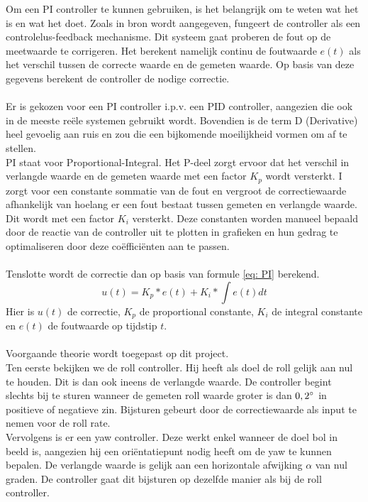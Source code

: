 \noindent
Om een PI controller te kunnen gebruiken, is het belangrijk om te weten wat het is en wat het doet. Zoals in bron \cite{website:PIDController} wordt aangegeven, fungeert de controller als een controlelus-feedback mechanisme. Dit systeem gaat proberen de fout op de meetwaarde te corrigeren. Het berekent namelijk continu de foutwaarde \(e(t)\) als het verschil tussen de correcte waarde en de gemeten waarde. Op basis van deze gegevens berekent de controller de nodige correctie.
\\
\\
Er is gekozen voor een PI controller i.p.v. een PID controller, aangezien die ook in de meeste re\"ele systemen gebruikt wordt. Bovendien is de term D (Derivative) heel gevoelig aan ruis en zou die een bijkomende moeilijkheid vormen om af te stellen.
\\
PI staat voor Proportional-Integral. Het P-deel zorgt ervoor dat het verschil in verlangde waarde en de gemeten waarde met een factor $K_p$ wordt versterkt. 
I zorgt voor een constante sommatie van de fout en vergroot de correctiewaarde afhankelijk van hoelang er een fout bestaat tussen gemeten en verlangde waarde. Dit wordt met een factor $K_i$ versterkt. Deze constanten worden manueel bepaald door de reactie van de controller uit te plotten in grafieken en hun gedrag te optimaliseren door deze co\"effici\"enten aan te passen.
\\
\\
Tenslotte wordt de correctie dan op basis van formule \ref{eq: PI} berekend.
\begin{equation} \label{eq: PI}
	u(t) = K_p * e(t) + K_i * \int e(t) dt
\end{equation}
Hier is \(u(t)\) de correctie, $K_p$ de proportional constante, $K_i$ de integral constante en \(e(t)\) de foutwaarde op tijdstip \(t\).
\\
\\
Voorgaande theorie wordt toegepast op dit project.
\\
Ten eerste bekijken we de roll controller. Hij heeft als doel de roll gelijk aan nul te houden. Dit is dan ook ineens de verlangde waarde. De controller begint slechts bij te sturen wanneer de gemeten roll waarde groter is dan \(0,2\degree\) in positieve of negatieve zin. Bijsturen gebeurt door de correctiewaarde als input te nemen voor de roll rate.
\\
Vervolgens is er een yaw controller. Deze werkt enkel wanneer de doel bol in beeld is, aangezien hij een ori\"entatiepunt nodig heeft om de yaw te kunnen bepalen. De verlangde waarde is gelijk aan een horizontale afwijking $\alpha$ van nul graden. De controller gaat dit bijsturen op dezelfde manier als bij de roll controller.
